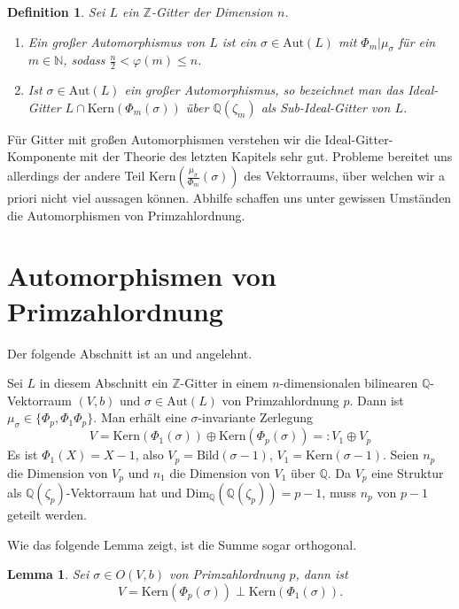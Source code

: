 \documentclass[12pt,a4paper,halfparskip,headsepline,bibtotocnumbered]{scrreprt}
\theoremstyle{nummermitklammern}
\newtheorem{definition}[defsatzusw]{Definition}
\newtheorem{lemma}[defsatzusw]{Lemma}
\theoremstyle{nonumberbreak}
\newcommand{\N}{\mathbb{N}}
\newcommand{\Z}{\mathbb{Z}}
\newcommand{\Q}{\mathbb{Q}}
\newcommand{\Kern}{\text{Kern}}
\newcommand{\Bild}{\text{Bild}}
\newcommand{\Aut}{\text{Aut}}
\begin{document}
\begin{framed}
	\begin{definition}
		Sei $L$ ein $\Z$-Gitter der Dimension $n$.
		\begin{enumerate}[label=(\roman*)]
			\item Ein \textit{großer Automorphismus} von $L$ ist ein $\sigma \in \Aut(L)$ mit $\Phi_m \vert \mu_\sigma$ für ein $m \in \N$, sodass $\frac{n}{2} < \varphi(m) \leq n$.
			\item Ist $\sigma \in \Aut(L)$ ein großer Automorphismus, so bezeichnet man das Ideal-Gitter $L \cap  \Kern(\Phi_m(\sigma))$ über $\Q(\zeta_m)$ als \textit{Sub-Ideal-Gitter} von $L$.
		\end{enumerate}
	\end{definition}
\end{framed}

Für Gitter mit großen Automorphismen verstehen wir die Ideal-Gitter-Komponente mit der Theorie des letzten Kapitels sehr gut. Probleme bereitet uns allerdings der andere Teil $\Kern\left(\frac{\mu_\sigma}{\Phi_m}(\sigma)\right)$ des Vektorraums, über welchen wir a priori nicht viel aussagen können. Abhilfe schaffen uns unter gewissen Umständen die Automorphismen von Primzahlordnung.

\section{Automorphismen von Primzahlordnung}
Der folgende Abschnitt ist an \cite[Kap. 4]{juergens} und \cite[Kap. 4]{nebe} angelehnt.\par
Sei $L$ in diesem Abschnitt ein $\Z$-Gitter in einem $n$-dimensionalen bilinearen $\Q$-Vektorraum $(V,b)$ und $\sigma \in \Aut(L)$ von Primzahlordnung $p$. Dann ist $\mu_\sigma \in \lbrace \Phi_p, \Phi_1 \Phi_p \rbrace$. Man erhält eine $\sigma$-invariante Zerlegung
\begin{equation*}
	V = \Kern(\Phi_1(\sigma)) \oplus \Kern(\Phi_p(\sigma)) =: V_1 \oplus V_p
\end{equation*}
Es ist $\Phi_1(X) = X-1$, also $V_p = \Bild(\sigma - 1)$, $V_1 = \Kern(\sigma - 1)$. Seien $n_p$ die Dimension von $V_p$ und $n_1$ die Dimension von $V_1$ über $\Q$. Da $V_p$ eine Struktur als $\Q(\zeta_p)$-Vektorraum hat und $\text{Dim}_\Q(\Q(\zeta_p)) = p-1$, muss $n_p$ von $p-1$ geteilt werden.\par
Wie das folgende Lemma zeigt, ist die Summe sogar orthogonal.

\begin{framed}
	\begin{lemma}
		Sei $\sigma \in O(V,b)$ von Primzahlordnung $p$, dann ist
		\begin{equation*}
			V = \Kern(\Phi_p(\sigma)) \perp \Kern(\Phi_1(\sigma)).
		\end{equation*}
	\end{lemma}
\end{framed}
\end{document}
